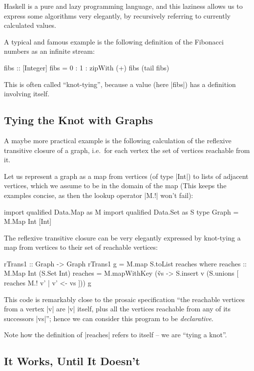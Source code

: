 \documentclass[manuscript,screen,acmsmall,nonacm]{acmart}
\begin{document}
Haskell is a pure and lazy programming language, and this laziness allows us to express some algorithms very elegantly, by recursively referring to currently calculated values.

A typical and famous example is the following definition of the Fibonacci numbers as an infinite stream:
\begin{code}
fibs :: [Integer]
fibs = 0 : 1 : zipWith (+) fibs (tail fibs)
\end{code}
This is often called “knot-tying”, because a value (here |fibs|) has a definition involving itself.

\subsection{Tying the Knot with Graphs}

A maybe more practical example is the following calculation of the reflexive transitive closure of a graph, i.e.\ for each vertex the set of vertices reachable from it.

Let us represent a graph as a map from vertices (of type |Int|) to lists of adjacent vertices, which we assume to be in the domain of the map (This keeps the examples concise, as then the lookup operator |M.!| won't fail):
\begin{code}
import qualified Data.Map as M
import qualified Data.Set as S
type Graph = M.Map Int [Int]
\end{code}

\goodbreak

The reflexive transitive closure can be very elegantly expressed by knot-tying a map from vertices to their set of reachable vertices:
\begin{code}
rTrans1 :: Graph -> Graph
rTrans1 g = M.map S.toList reaches
  where
    reaches :: M.Map Int (S.Set Int)
    reaches = M.mapWithKey (\v vs -> S.insert v (S.unions [ reaches M.! v' | v' <- vs ])) g
\end{code}
This code is remarkably close to the prosaic specification “the reachable vertices from a vertex |v| are |v| itself, plus all the vertices reachable from any of its successors |vs|”; hence we can consider this program to be \emph{declarative}.

Note how the definition of |reaches| refers to itself -- we are “tying a knot”.

\subsection{It Works, Until It Doesn't}
\end{document}
